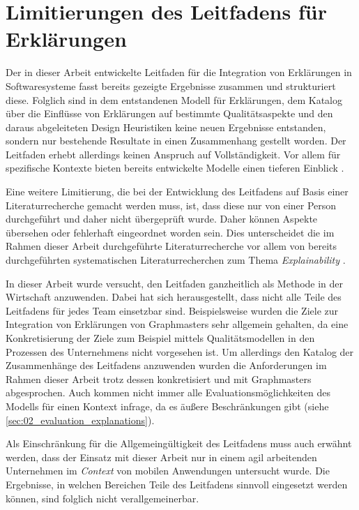 \section{Limitierungen des Leitfadens für Erklärungen}

Der in dieser Arbeit entwickelte Leitfaden für die Integration von Erklärungen in Softwaresysteme fasst bereits gezeigte Ergebnisse zusammen und strukturiert diese. Folglich sind in dem entstandenen Modell für Erklärungen, dem Katalog über die Einflüsse von Erklärungen auf bestimmte Qualitätsaspekte und den daraus abgeleiteten Design Heuristiken keine neuen Ergebnisse entstanden, sondern nur bestehende Resultate in einen Zusammenhang gestellt worden. 
Der Leitfaden erhebt allerdings keinen Anspruch auf Vollständigkeit. Vor allem für spezifische Kontexte bieten bereits entwickelte Modelle einen tieferen Einblick \cite{nunes_systematic_2017, sokol_explainability_2020}.

Eine weitere Limitierung, die bei der Entwicklung des Leitfadens auf Basis einer Literaturrecherche gemacht werden muss, ist, dass diese nur von einer Person durchgeführt und daher nicht übergeprüft wurde. Daher können Aspekte übersehen oder fehlerhaft eingeordnet worden sein. Dies unterscheidet die im Rahmen dieser Arbeit durchgeführte Literaturrecherche vor allem von bereits durchgeführten systematischen Literaturrecherchen zum Thema \textit{Explainability} \cite[vgl.][]{nunes_systematic_2017,chazette_knowledge_nodate}.

In dieser Arbeit wurde versucht, den Leitfaden ganzheitlich als Methode in der Wirtschaft anzuwenden. Dabei hat sich herausgestellt, dass nicht alle Teile des Leitfadens für jedes Team einsetzbar sind. Beispielsweise wurden die Ziele zur Integration von Erklärungen von Graphmasters sehr allgemein gehalten, da eine Konkretisierung der Ziele zum Beispiel mittels Qualitätsmodellen \cite{schneider2012abenteuer} in den Prozessen des Unternehmens nicht vorgesehen ist. Um allerdings den Katalog der Zusammenhänge des Leitfadens anzuwenden wurden die Anforderungen im Rahmen dieser Arbeit trotz dessen konkretisiert und mit Graphmasters abgesprochen. Auch kommen nicht immer alle Evaluationsmöglichkeiten des Modells für einen Kontext infrage, da es äußere Beschränkungen gibt (siehe \autoref{sec:02_evaluation_explanations}).

Als Einschränkung für die Allgemeingültigkeit des Leitfadens muss auch erwähnt werden, dass der Einsatz mit dieser Arbeit nur in einem agil arbeitenden Unternehmen im \textit{Context} von mobilen Anwendungen untersucht wurde. Die Ergebnisse, in welchen Bereichen Teile des Leitfadens sinnvoll eingesetzt werden können, sind folglich nicht verallgemeinerbar.

